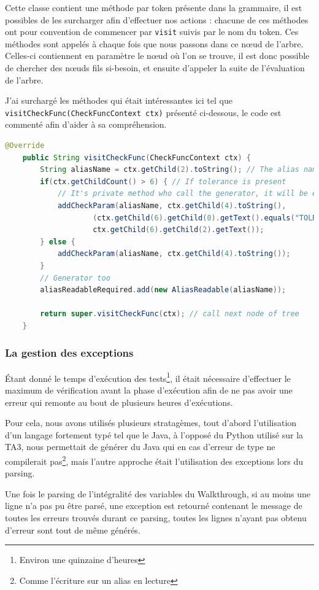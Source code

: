 	Cette classe contient une méthode par token présente dans la grammaire, il est possibles de les surcharger afin d'effectuer nos actions : chacune de ces méthodes ont pour convention de commencer par \texttt{visit} suivis par le nom du token. Ces méthodes sont appelés à chaque fois que nous passons dans ce n\oe{}ud de l'arbre. Celles-ci contiennent en paramètre le n\oe{}ud où l'on se trouve, il est donc possible de chercher des nœuds fils si-besoin, et ensuite d'appeler la suite de l'évaluation de l'arbre. 

	J'ai surchargé les méthodes qui était intéressantes ici tel que \texttt{visitCheckFunc(CheckFuncContext ctx)} présenté ci-dessous, le code est commenté afin d'aider à sa compréhension.
\begin{lstlisting}[language=Java, caption=Surcharge de \texttt{visitCheckFunc}]
	@Override
	public String visitCheckFunc(CheckFuncContext ctx) {
		String aliasName = ctx.getChild(2).toString(); // The alias name to check
		if(ctx.getChildCount() > 6) { // If tolerance is present
			// It's private method who call the generator, it will be explained after
			addCheckParam(aliasName, ctx.getChild(4).toString(), 
					(ctx.getChild(6).getChild(0).getText().equals("TOLRES") ? TolType.TOLRES : TolType.TOLPER), 
					ctx.getChild(6).getChild(2).getText());
		} else {
			addCheckParam(aliasName, ctx.getChild(4).toString());
		}
		// Generator too
		aliasReadableRequired.add(new AliasReadable(aliasName));

		return super.visitCheckFunc(ctx); // call next node of tree
	}
\end{lstlisting}
		\subsubsection{La gestion des exceptions}
\'Etant donné le temps d'exécution des tests\footnote{Environ une quinzaine d'heures}, il était nécessaire d'effectuer le maximum de vérification avant la phase d'exécution afin de ne pas avoir une erreur qui remonte au bout de plusieurs heures d'exécutions. 

Pour cela, nous avons utilisés plusieurs stratagèmes, tout d'abord l'utilisation d'un langage fortement typé tel que le Java, à l'opposé du Python utilisé sur la TA3, nous permettait de générer du Java qui en cas d'erreur de type ne compilerait pas\footnote{Comme l'écriture sur un alias en lecture}, mais l'autre approche était l'utilisation des exceptions lors du parsing.

Une fois le parsing de l'intégralité des variables du Walkthrough, si au moins une ligne n'a pas pu être parsé, une exception est retourné contenant le message de toutes les erreurs trouvés durant ce parsing, toutes les lignes n'ayant pas obtenu d'erreur sont tout de même générés.

